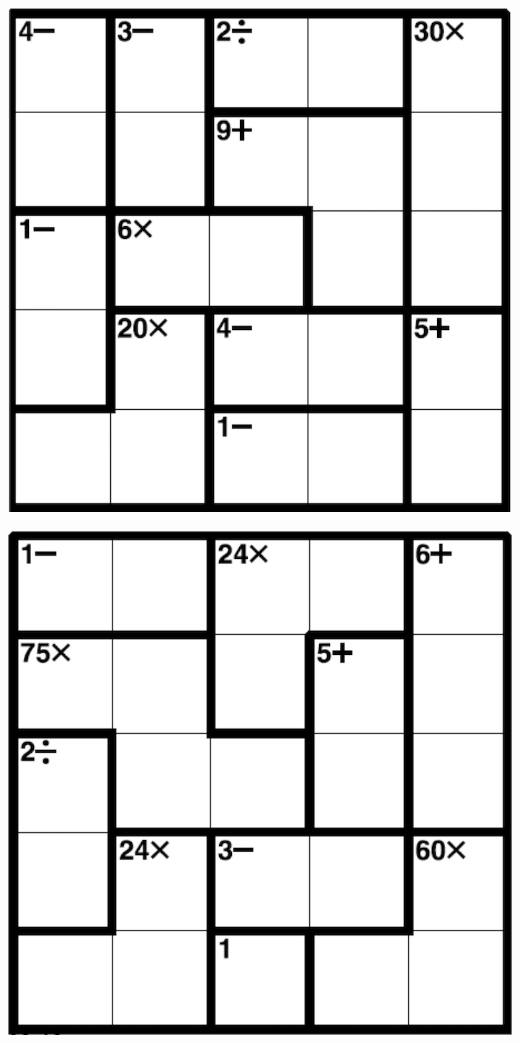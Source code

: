 
\includegraphics[scale=1]{Gambar/Lampiran/5x5_15.png}

\includegraphics[scale=1]{Gambar/Lampiran/5x5_16.png}
